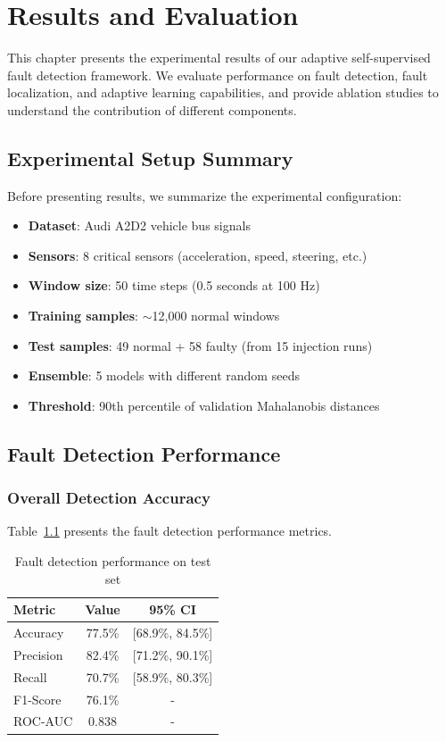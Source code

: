 \chapter{Results and Evaluation}
\label{chap:results}

This chapter presents the experimental results of our adaptive self-supervised fault detection framework. We evaluate performance on fault detection, fault localization, and adaptive learning capabilities, and provide ablation studies to understand the contribution of different components.

\section{Experimental Setup Summary}

Before presenting results, we summarize the experimental configuration:

\begin{itemize}
    \item \textbf{Dataset}: Audi A2D2 vehicle bus signals
    \item \textbf{Sensors}: 8 critical sensors (acceleration, speed, steering, etc.)
    \item \textbf{Window size}: 50 time steps (0.5 seconds at 100 Hz)
    \item \textbf{Training samples}: $\sim$12,000 normal windows
    \item \textbf{Test samples}: 49 normal + 58 faulty (from 15 injection runs)
    \item \textbf{Ensemble}: 5 models with different random seeds
    \item \textbf{Threshold}: 90th percentile of validation Mahalanobis distances
\end{itemize}

\section{Fault Detection Performance}

\subsection{Overall Detection Accuracy}

Table~\ref{tab:detection_results} presents the fault detection performance metrics.

\begin{table}[htbp]
\centering
\caption{Fault detection performance on test set}
\label{tab:detection_results}
\begin{tabular}{@{}lcc@{}}
\toprule
Metric & Value & 95\% CI \\
\midrule
Accuracy & 77.5\% & [68.9\%, 84.5\%] \\
Precision & 82.4\% & [71.2\%, 90.1\%] \\
Recall & 70.7\% & [58.9\%, 80.3\%] \\
F1-Score & 76.1\% & - \\
ROC-AUC & 0.838 & - \\
\bottomrule
\end{tabular}
\end{table}

